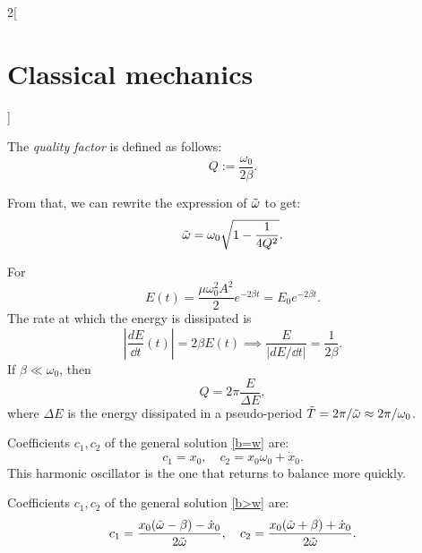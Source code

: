 \documentclass[../../../main.tex]{subfiles}
\begin{document}
\begin{multicols}{2}[\section{Classical mechanics}]
\begin{definition}
    The \textit{quality factor} is defined as follows: $$Q:=\frac{\omega_0}{2\beta}.$$
  \end{definition}
  \noindent From that, we can rewrite the expression of $\Tilde{\omega}$ to get: $$\Tilde{\omega}=\omega_0\sqrt{1-\frac{1}{4Q^2}}.$$
  \begin{prop}
    For
    $$E(t)=\frac{\mu\omega_0^2A^2}{2}e^{-2\beta t}=E_0e^{-2\beta t}.$$ The rate at which the energy is dissipated is $$\left|\frac{dE}{\dd t}(t)\right|=2\beta E(t)\implies\frac{E}{\left|dE/\dd t\right|}=\frac{1}{2\beta}.$$
    If $\beta\ll\omega_0$, then $$Q=2\pi\frac{E}{\Delta E},$$ where $\Delta E$ is the energy dissipated in a pseudo-period $\Tilde{T}=2\pi/\Tilde{\omega}\approx2\pi/\omega_0$.
  \end{prop}
  \begin{prop}[Critically damped harmonic oscillator: $\beta=\omega_0$]
    Coefficients $c_1,c_2$ of the general solution \eqref{b=w} are: $$c_1=x_0,\quad c_2=x_0\omega_0+\dot{x}_0.$$ This harmonic oscillator is the one that returns to balance more quickly.
  \end{prop}
  \begin{prop}
    Coefficients $c_1,c_2$ of the general solution \eqref{b>w} are: $$c_1=\frac{x_0(\Tilde{\omega}-\beta)-\dot{x}_0}{2\Tilde{\omega}},\quad c_2=\frac{x_0(\Tilde{\omega}+\beta)+\dot{x}_0}{2\Tilde{\omega}}.$$
  \end{prop}

\end{multicols}
\end{document}
